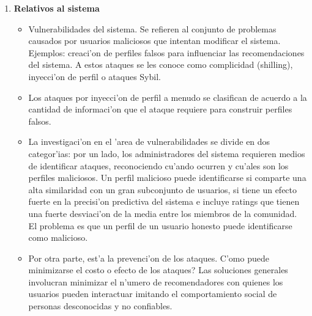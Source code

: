 \documentclass[11pt]{article}
\begin{document}
\begin{enumerate}
\item \textbf{Relativos al sistema}
\begin{itemize}
\item Vulnerabilidades del sistema. Se refieren al conjunto de problemas causados por usuarios maliciosos que intentan modificar el sistema. Ejemplos: creaci'on de perfiles falsos para influenciar las recomendaciones del sistema. A estos ataques se les conoce como complicidad (shilling), inyecci'on de perfil o ataques Sybil.
\item Los ataques por inyecci'on de perfil a menudo se clasifican de acuerdo a la cantidad de informaci'on que el ataque requiere para construir perfiles falsos.
\item La investigaci'on en el 'area de vulnerabilidades se divide en dos categor'ias: por un lado, los administradores del sistema requieren medios de identificar ataques, reconociendo cu'ando ocurren y cu'ales son los perfiles maliciosos. Un perfil malicioso puede identificarse si comparte una alta similaridad con un gran subconjunto de usuarios, si tiene un efecto fuerte en la precisi'on predictiva del sistema e incluye ratings que tienen una fuerte desviaci'on de la media entre los miembros de la comunidad. El problema es que un perfil de un usuario honesto puede identificarse como malicioso.
\item Por otra parte, est'a la prevenci'on de los ataques. \textquestiondown C'omo puede minimizarse el costo o efecto de los ataques? Las soluciones generales involucran minimizar el n'umero de recomendadores con quienes los usuarios pueden interactuar imitando el comportamiento social de personas desconocidas y no confiables.
\end{itemize}
\end{enumerate}

\end{document}
